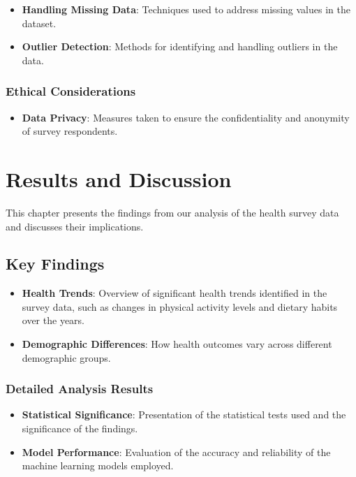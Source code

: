 \documentclass[
]{book}
\providecommand{\tightlist}{%
  \setlength{\itemsep}{0pt}\setlength{\parskip}{0pt}}
\begin{document}
\begin{itemize}
\tightlist
\item
  \textbf{Handling Missing Data}: Techniques used to address missing values in the dataset.
\item
  \textbf{Outlier Detection}: Methods for identifying and handling outliers in the data.
\end{itemize}

\subsection*{Ethical Considerations}\label{ethical-considerations}

\begin{itemize}
\tightlist
\item
  \textbf{Data Privacy}: Measures taken to ensure the confidentiality and anonymity of survey respondents.
\end{itemize}

\chapter{Results and Discussion}\label{results-and-discussion}

This chapter presents the findings from our analysis of the health survey data and discusses their implications.

\section{Key Findings}\label{key-findings}

\begin{itemize}
\tightlist
\item
  \textbf{Health Trends}: Overview of significant health trends identified in the survey data, such as changes in physical activity levels and dietary habits over the years.
\item
  \textbf{Demographic Differences}: How health outcomes vary across different demographic groups.
\end{itemize}

\subsection*{Detailed Analysis Results}\label{detailed-analysis-results}

\begin{itemize}
\tightlist
\item
  \textbf{Statistical Significance}: Presentation of the statistical tests used and the significance of the findings.
\item
  \textbf{Model Performance}: Evaluation of the accuracy and reliability of the machine learning models employed.
\end{itemize}
\end{document}
